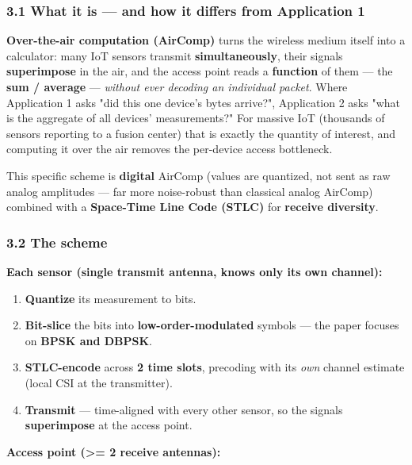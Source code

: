 \documentclass[
  10pt,
]{article}
\providecommand{\tightlist}{%
  \setlength{\itemsep}{0pt}\setlength{\parskip}{0pt}}
\begin{document}
\hypertarget{31-what-it-is--and-how-it-differs-from-application-1}{%
\subsubsection{3.1 What it is --- and how it differs from Application
1}\label{31-what-it-is--and-how-it-differs-from-application-1}}

\textbf{Over-the-air computation (AirComp)} turns the wireless medium
itself into a calculator: many IoT sensors transmit
\textbf{simultaneously}, their signals \textbf{superimpose} in the air,
and the access point reads a \textbf{function} of them --- the
\textbf{sum / average} --- \emph{without ever decoding an individual
packet}. Where Application 1 asks "did this one device's bytes arrive?",
Application 2 asks "what is the aggregate of all devices' measurements?"
For massive IoT (thousands of sensors reporting to a fusion center) that
is exactly the quantity of interest, and computing it over the air
removes the per-device access bottleneck.

This specific scheme is \textbf{digital} AirComp (values are quantized,
not sent as raw analog amplitudes --- far more noise-robust than
classical analog AirComp) combined with a \textbf{Space-Time Line Code
(STLC)} for \textbf{receive diversity}.

\hypertarget{32-the-scheme}{%
\subsubsection{3.2 The scheme}\label{32-the-scheme}}

\textbf{Each sensor (single transmit antenna, knows only its own
channel):}

\begin{enumerate}
\def\labelenumi{\arabic{enumi}.}
\tightlist
\item
  \textbf{Quantize} its measurement to bits.
\item
  \textbf{Bit-slice} the bits into \textbf{low-order-modulated} symbols
  --- the paper focuses on \textbf{BPSK and DBPSK}.
\item
  \textbf{STLC-encode} across \textbf{2 time slots}, precoding with its
  \emph{own} channel estimate (local CSI at the transmitter).
\item
  \textbf{Transmit} --- time-aligned with every other sensor, so the
  signals \textbf{superimpose} at the access point.
\end{enumerate}

\textbf{Access point (\textgreater= 2 receive antennas):}
\end{document}
